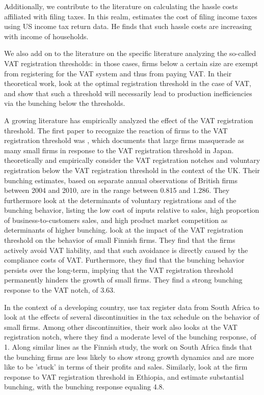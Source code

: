Additionally, we contribute to the literature on calculating the hassle costs affiliated with filing taxes. In this realm, \citet{benzarti2017taxing} estimates the cost of filing income taxes using US income tax return data. He finds that such hassle costs are increasing with income of households. 

We also add on to the literature on the specific literature analyzing the so-called VAT registration thresholds:
in those cases, firms below a certain size are exempt from registering for the VAT system and thus from paying 
VAT. In their theoretical work, \citet{keen2004optimal} look at the optimal registration threshold in the case of VAT, and show that such a threshold will necessarily lead to production inefficiencies via the bunching below the thresholds. 

A growing literature has empirically analyzed the effect of the VAT registration threshold. The first paper to recognize the reaction of firms to the VAT registration threshold was \citet{onji2009response}, which documents that large firms masquerade as many small firms in response to the VAT registration threshold in Japan. \citet{liu2017vat} theoretically and empirically consider the VAT registration notches and voluntary registration below the VAT registration threshold in the context of the UK. Their bunching estimates, based on separate annual observations of British firms between 2004 and 2010, are in the range between 0.815 and 1.286. They furthermore look at the determinants of voluntary registrations and of the bunching behavior, listing the low cost of inputs relative to sales, high proportion of business-to-customers sales, and high product market competition as determinants of higher bunching. \citet{harju2016effects} look at the impact of the VAT registration threshold on the behavior of small Finnish firms. They find that the firms actively avoid VAT liability, and that such avoidance is directly caused by the compliance costs of VAT. Furthermore, they find that the bunching behavior persists over the long-term, implying that the VAT registration threshold permanently hinders the growth of small firms. They find a strong bunching response to the VAT notch, of 3.63. 

In the context of a developing country, \citet{boonzaaier2017small} use tax register data from South Africa to look at the effects of several discontinuities in the tax schedule on the behavior of small firms. Among other discontinuities, their work also looks at the VAT registration notch, where they find a moderate level of the bunching response, of 1. Along similar lines as the Finnish study, the work on South Africa finds that the bunching firms are less likely to show strong growth dynamics and are more like to be 'stuck' in terms of their profits and sales. Similarly, \citet{gebresilasse2016firm} look at the firm response to VAT registration threshold in Ethiopia, and estimate substantial bunching, with the bunching response equaling 4.8.  

